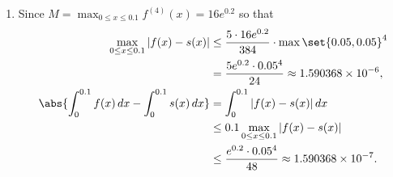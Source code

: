 \documentclass{homework}
\begin{document}
{\begin{enumerate}[label={(\alph*)},topsep=0pt]
\begin{align*}
\begin{pmatrix}
                      1.5487625 \\
                  \end{pmatrix}.
              \end{align*}
              Therefore,
              \begin{align*}
                  \int_0^{0.1}s(x)\,dx & = \int_0^{0.05} \paren[\big]{(1+ax+bx^2+cx^3)+(e^{0.1}+Ax+Bx^2+Cx^3)}\,dx
                  \\ &\approx 0.110701363708553.
              \end{align*}
              The true value $\int_0^{0.1}f(x)\,dx\approx 0.110701379080085$ is very close to the approximated integral. The absolute error is about $1.5371532\times 10^{-8}$.
        \item Since $M=\max_{0\le x\le 0.1}f^{(4)}(x) = 16e^{0.2}$ so that
        \begin{align*}
            \max_{0\le x\le 0.1} |f(x)-s(x)| &\le \frac{5\cdot 16e^{0.2}}{384}\cdot \max\set{0.05, 0.05}^4 
            \\&= \frac{5e^{0.2}\cdot 0.05^4}{24}\approx 1.590368\times 10^{-6} ,\\
            \abs{\int_0^{0.1} f(x)\,dx-\int_0^{0.1} s(x)\,dx} & = \int_0^{0.1} |f(x)-s(x)|\,dx
                  \\ &\le 0.1\max_{0\le x\le 0.1} |f(x)-s(x)|
                  \\ &\le \frac{e^{0.2}\cdot 0.05^4}{48}\approx 1.590368\times 10^{-7}.
        \end{align*}
    \end{enumerate}
}
\end{document}
